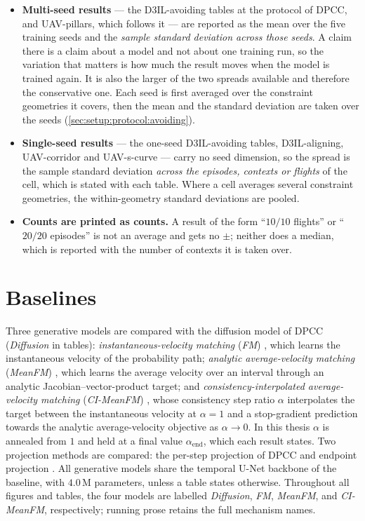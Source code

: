 \begin{itemize}
  \item \textbf{Multi-seed results} --- the D3IL-avoiding tables at the protocol of \ac{DPCC}, and
    UAV-pillars, which follows it --- are reported as the mean over the
    five training seeds and the \emph{sample standard deviation across those seeds}. A claim there is a
    claim about a model and not about one training run, so the variation that matters is how much the
    result moves when the model is trained again. It is also the larger of the two spreads available and
    therefore the conservative one. Each seed is first averaged over the constraint geometries it covers,
    then the mean and the standard deviation are taken over the seeds
    (\autoref{sec:setup:protocol:avoiding}).
  \item \textbf{Single-seed results} --- the one-seed D3IL-avoiding tables, D3IL-aligning, UAV-corridor and
    UAV-s-curve --- carry no seed dimension, so the spread is the sample standard deviation
    \emph{across the episodes, contexts or flights} of the cell, which is stated with each table. Where a
    cell averages several constraint geometries, the within-geometry standard deviations are pooled.
  \item \textbf{Counts are printed as counts.} A result of the form \enquote{$10/10$ flights} or
    \enquote{$20/20$ episodes} is not an average and gets no $\pm$; neither does a median, which is
    reported with the number of contexts it is taken over.
\end{itemize}

\section{Baselines}\label{sec:setup:baselines}

Three generative models are compared with the diffusion model of \ac{DPCC} (\emph{Diffusion} in tables):
\emph{instantaneous-velocity matching} (\emph{FM}) \parencite{lipman2023flow}, which learns the
instantaneous velocity of the probability path; \emph{analytic average-velocity matching}
(\emph{MeanFM}) \parencite{geng2025meanflow}, which learns the average velocity over an interval through
an analytic Jacobian--vector-product target; and \emph{consistency-interpolated average-velocity
matching} (\emph{CI-MeanFM}) \parencite{zhang2025alphaflow}, whose consistency step ratio $\alpha$
interpolates the target between the instantaneous velocity at $\alpha=1$ and a stop-gradient prediction
towards the analytic average-velocity objective as $\alpha\to0$. In this thesis $\alpha$ is annealed from
$1$ and held at a final value
$\alpha_{\mathrm{end}}$, which each result states. Two projection methods are compared: the per-step projection of
\ac{DPCC} and endpoint projection \parencite{li2025hardflow}. All generative models share the temporal
U-Net backbone of the baseline, with $4.0$\,M parameters, unless a table states otherwise. Throughout
all figures and tables, the four models are labelled \emph{Diffusion}, \emph{FM}, \emph{MeanFM}, and
\emph{CI-MeanFM}, respectively; running prose retains the full mechanism names.

